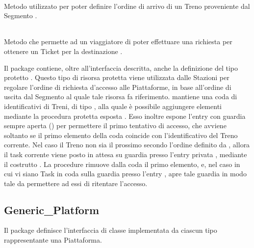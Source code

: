 \begin{description}
		\item {} \\
		Metodo utilizzato per poter definire l'ordine di arrivo di un Treno  proveniente dal Segmento .	
	
		\item {} \\
		Metodo che permette ad un viaggiatore  di poter effettuare una richiesta per ottenere un Ticket per la destinazione .
	\end{description}
	
	Il package contiene, oltre all'interfaccia descritta, anche la definizione del tipo protetto . Questo tipo di risorsa protetta viene utilizzata dalle Stazioni per regolare l'ordine di richiesta d'accesso alle Piattaforme, in base all'ordine di uscita dal Segmento al quale tale risorsa fa riferimento.  mantiene una coda  di identificativi di Treni, di tipo , alla quale è possibile aggiungere elementi mediante la procedura protetta esposta . Esso inoltre espone l'entry  con guardia sempre aperta () per permettere il primo tentativo di accesso, che avviene soltanto se il primo elemento della coda coincide con l'identificativo del Treno corrente. Nel caso il Treno non sia il prossimo secondo l'ordine definito da , allora il task corrente viene posto in attesa su guardia presso l'entry privata , mediante il costrutto . La procedure  rimuove dalla coda il primo elemento, e, nel caso in cui vi siano Task in coda sulla guardia presso l'entry , apre tale guardia in modo tale da permettere ad essi di ritentare l'accesso.
	
	\subsection{Generic\_Platform}
	
	Il package  definisce l'interfaccia di classe  implementata da ciascun tipo rappresentante una Piattaforma.
	
